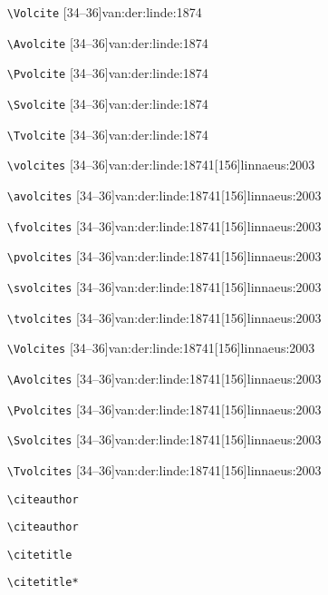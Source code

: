 \documentclass[a4paper,12pt]{scrartcl}
\newcommand*{\Befehl}[1]{\texttt{\textbackslash#1}}
\begin{document}
\begin{enumerate}
	\item[\footnotesize\Befehl{Volcite}] [34--36]{van:der:linde:1874}
	\item[\footnotesize\Befehl{Avolcite}] [34--36]{van:der:linde:1874}
	\item[\footnotesize\Befehl{Pvolcite}] [34--36]{van:der:linde:1874}
	\item[\footnotesize\Befehl{Svolcite}] [34--36]{van:der:linde:1874}
	\item[\footnotesize\Befehl{Tvolcite}] [34--36]{van:der:linde:1874}
	\item[\footnotesize\Befehl{volcites}] [34--36]{van:der:linde:1874}{1}[156]{linnaeus:2003}
	\item[\footnotesize\Befehl{avolcites}] [34--36]{van:der:linde:1874}{1}[156]{linnaeus:2003}
	\item[\footnotesize\Befehl{fvolcites}] [34--36]{van:der:linde:1874}{1}[156]{linnaeus:2003}
	\item[\footnotesize\Befehl{pvolcites}] [34--36]{van:der:linde:1874}{1}[156]{linnaeus:2003}
	\item[\footnotesize\Befehl{svolcites}] [34--36]{van:der:linde:1874}{1}[156]{linnaeus:2003}
	\item[\footnotesize\Befehl{tvolcites}] [34--36]{van:der:linde:1874}{1}[156]{linnaeus:2003}
	\item[\footnotesize\Befehl{Volcites}] [34--36]{van:der:linde:1874}{1}[156]{linnaeus:2003}
	\item[\footnotesize\Befehl{Avolcites}] [34--36]{van:der:linde:1874}{1}[156]{linnaeus:2003}
	\item[\footnotesize\Befehl{Pvolcites}] [34--36]{van:der:linde:1874}{1}[156]{linnaeus:2003}
	\item[\footnotesize\Befehl{Svolcites}] [34--36]{van:der:linde:1874}{1}[156]{linnaeus:2003}
	\item[\footnotesize\Befehl{Tvolcites}] [34--36]{van:der:linde:1874}{1}[156]{linnaeus:2003}
    \item[\footnotesize\Befehl{citeauthor}] \citeauthor{auler:hiller:2015}
    \item[\footnotesize\Befehl{citeauthor}] 
    \item[\footnotesize\Befehl{citetitle}] 
    \item[\footnotesize\Befehl{citetitle*}] 

\end{enumerate}
\end{document}
